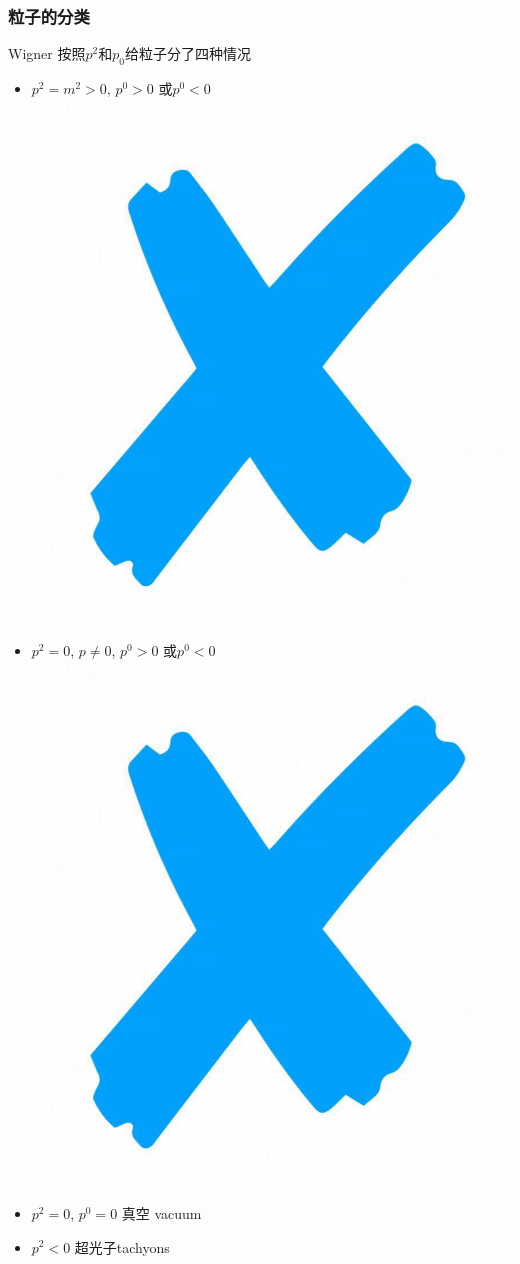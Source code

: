 \documentclass[CJK]{beamer}
\begin{document}
\begin{frame}\frametitle{\bch 粒子的分类\ech}
  \bch
  Wigner 按照$p^2$和$p_0$给粒子分了四种情况
  \begin{itemize}
  \item $p^2=m^2>0$, $p^0>0$ 或$p^0<0$ \includegraphics[scale=0.02]{error} 
  \item $p^2=0$, $p\ne 0$,  $p^0>0$ 或$p^0<0$ \includegraphics[scale=0.02]{error}
  \item $p^2=0$, $p^0= 0$ 真空 vacuum
  \item $p^2<0$ 超光子tachyons
  \end{itemize}
  \ech
\end{frame}
\end{document}
